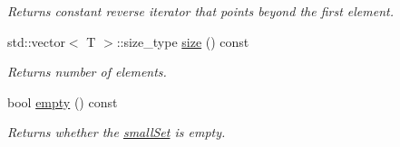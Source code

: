 \begin{CompactItemize}
\begin{CompactList}\small\item\em Returns constant reverse iterator that points beyond the first element. \item\end{CompactList}\item 
\hypertarget{classdai_1_1smallSet_39b00df453666d22331e932d3b7a2f16}{
std::vector$<$ T $>$::size\_\-type \hyperlink{classdai_1_1smallSet_39b00df453666d22331e932d3b7a2f16}{size} () const }
\label{classdai_1_1smallSet_39b00df453666d22331e932d3b7a2f16}

\begin{CompactList}\small\item\em Returns number of elements. \item\end{CompactList}\item 
\hypertarget{classdai_1_1smallSet_b405901de2feb12ff027b973a234a39c}{
bool \hyperlink{classdai_1_1smallSet_b405901de2feb12ff027b973a234a39c}{empty} () const }
\label{classdai_1_1smallSet_b405901de2feb12ff027b973a234a39c}

\begin{CompactList}\small\item\em Returns whether the \hyperlink{classdai_1_1smallSet}{smallSet} is empty. \item\end{CompactList}\end{CompactItemize}
